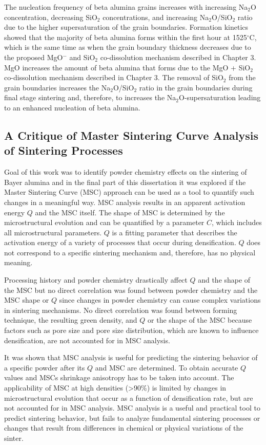 The nucleation frequency of beta alumina grains increases with increasing Na$_{2}$O concentration, decreasing SiO$_{2}$ concentrations, and increasing Na$_{2}$O/SiO$_{2}$ ratio due to the higher supersaturation of the grain boundaries. Formation kinetics showed that the majority of beta alumina forms within the first hour at 1525$^{\circ}$C, which is the same time as when the grain boundary thickness decreases due to the proposed MgO$^{-}$ and SiO$_{2}$ co-dissolution mechanism described in Chapter 3. MgO increases the amount of beta alumina that forms due to the MgO + SiO$_{2}$ co-dissolution mechanism described in Chapter 3. The removal of SiO$_{2}$ from the grain boundaries increases the Na$_{2}$O/SiO$_{2}$ ratio in the grain boundaries during final stage sintering and, therefore, to increases the Na$_{2}$O-supersaturation leading to an enhanced nucleation of beta alumina. 

\subsection{A Critique of Master Sintering Curve Analysis of Sintering Processes}
Goal of this work was to identify powder chemistry effects on the sintering of Bayer alumina and in the final part of this dissertation it was explored if the Master Sintering Curve (MSC) approach can be used as a tool to quantify such changes in a meaningful way. MSC analysis results in an apparent activation energy $Q$ and the MSC itself. The shape of MSC is determined by the microstructural evolution and can be quantified by a parameter $C$, which includes all microstructural parameters. $Q$ is a fitting parameter that describes the activation energy of a variety of processes that occur during densification. $Q$ does not correspond to a specific sintering mechanism and, therefore, has no physical meaning. 

Processing history and powder chemistry drastically affect $Q$ and the shape of the MSC but no direct correlation was found between powder chemistry and the MSC shape or $Q$ since changes in powder chemistry can cause complex variations in sintering mechanisms. No direct correlation was found between forming technique, the resulting green density, and $Q$ or the shape of the MSC because factors such as pore size and pore size distribution, which are known to influence densification, are not accounted for in MSC analysis. 

It was shown that MSC analysis is useful for predicting the sintering behavior of a specific powder after its $Q$ and MSC are determined. To obtain accurate $Q$ values and MSCs shrinkage anisotropy has to be taken into account. The applicability of MSC at high densities (>90\%) is limited by changes in microstructural evolution that occur as a function of densification rate, but are not accounted for in MSC analysis. MSC analysis is a useful and practical tool to predict sintering behavior, but fails to analyze fundamental sintering processes or changes that result from differences in chemical or physical variations of the sinter.

